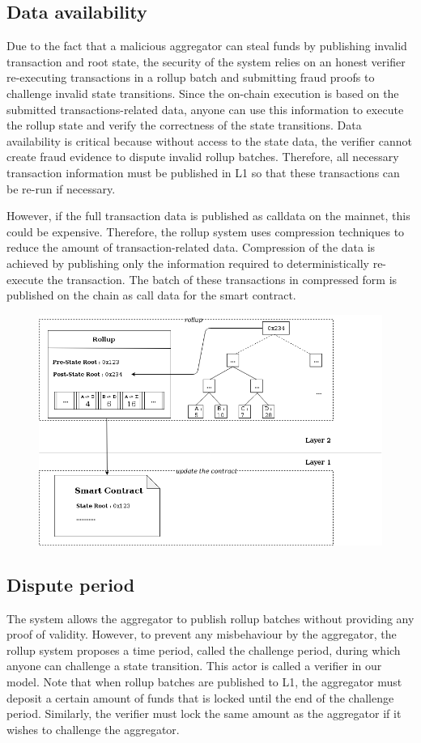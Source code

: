 \documentclass{article}
\begin{document}
\subsection{Data availability}

Due to the fact that a malicious aggregator can steal funds by publishing invalid transaction and root state, the security of the system relies on an honest verifier re-executing transactions in a rollup batch and submitting fraud proofs to challenge invalid state transitions. Since the on-chain execution is based on the submitted transactions-related data, anyone can use this information to execute the rollup state and verify the correctness of the state transitions.
Data availability is critical because without access to the state data, the verifier cannot create fraud evidence to dispute invalid rollup batches. Therefore, all necessary transaction information must be published in L1 so that these transactions can be re-run if necessary.

However, if the full transaction data is published as calldata on the mainnet, this could be expensive. Therefore, the rollup system uses compression techniques to reduce the amount of transaction-related data. Compression of the data is achieved by publishing only the information required to deterministically re-execute the transaction. The batch of these transactions in compressed form is published on the chain as call data for the smart contract.
\begin{figure}[t]
\includegraphics[width=12cm]{rollup-batch-data}
\centering
\end{figure}
\subsection{Dispute period}
The system allows the aggregator to publish rollup batches without providing any proof of validity. However, to prevent any misbehaviour by the aggregator, the rollup system proposes a time period, called the challenge period, during which anyone can challenge a state transition. This actor is called a verifier in our model. Note that when rollup batches are published to L1, the aggregator must deposit a certain amount of funds that is locked until  the end of the challenge period. Similarly, the verifier must lock the same amount as the aggregator if it wishes to challenge the aggregator.
\end{document}
